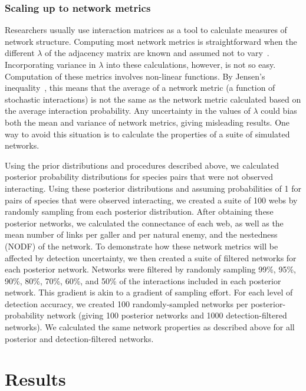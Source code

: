 \documentclass[12pt]{article}
\begin{document}
\begin{spacing}{2.0}
    \subsubsection*{Scaling up to network metrics}

      Researchers usually use interaction matrices as a tool to calculate measures of network structure. Computing most network metrics is straightforward when the different $\lambda$ of the adjacency matrix are known and assumed not to vary~\citep{Poisot2016}. Incorporating variance in $\lambda$ into these calculations, however, is not so easy. Computation of these metrics involves non-linear functions. By Jensen's inequality~\citep{Jensen1906}, this means that the average of a network metric (a function of stochastic interactions) is not the same as the network metric calculated based on the average interaction probability. Any uncertainty in the values of $\lambda$ could bias both the mean and variance of network metrics, giving misleading results. One way to avoid this situation is to calculate the properties of a suite of simulated networks.


      Using the prior distributions and procedures described above, we calculated posterior probability distributions for species pairs that were not observed interacting. Using these posterior distributions and assuming probabilities of 1 for pairs of species that were observed interacting, we created a suite of 100 webs by randomly sampling from each posterior distribution. After obtaining these posterior networks, we calculated the connectance of each web, as well as the mean number of links per galler and per natural enemy, and the nestedness (NODF) of the network. To demonstrate how these network metrics will be affected by detection uncertainty, we then created a suite of filtered networks for each posterior network. Networks were filtered by randomly sampling 99\%, 95\%, 90\%, 80\%, 70\%, 60\%, and 50\% of the interactions included in each posterior network. This gradient is akin to a gradient of sampling effort. For each level of detection accuracy, we created 100 randomly-sampled networks per posterior-probability network (giving 100 posterior networks and 1000 detection-filtered networks). We calculated the same network properties as described above for all posterior and detection-filtered networks.


\section*{Results}


\end{spacing}
\end{document}
